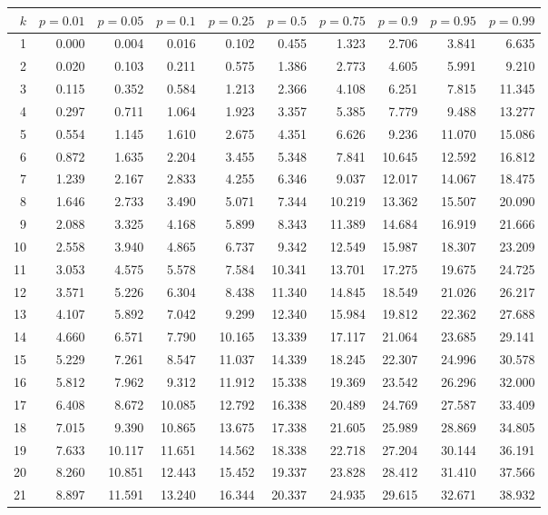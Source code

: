 %
%
%

\begin{table}[ht]
\begin{center}
\footnotesize
\begin{tabular}{|r|rrr|rrr|rrr|}
\hline
\strut$k$&$p=0.01$&$p=0.05$&$p=0.1$&$p=0.25$&$p=0.5$&$p=0.75$&$p=0.9$&$p=0.95$&$p=0.99$\\
\hline
1&0.000&0.004&0.016&0.102&0.455&1.323&2.706&3.841&6.635\\
2&0.020&0.103&0.211&0.575&1.386&2.773&4.605&5.991&9.210\\
3&0.115&0.352&0.584&1.213&2.366&4.108&6.251&7.815&11.345\\
4&0.297&0.711&1.064&1.923&3.357&5.385&7.779&9.488&13.277\\
5&0.554&1.145&1.610&2.675&4.351&6.626&9.236&11.070&15.086\\
6&0.872&1.635&2.204&3.455&5.348&7.841&10.645&12.592&16.812\\
7&1.239&2.167&2.833&4.255&6.346&9.037&12.017&14.067&18.475\\
8&1.646&2.733&3.490&5.071&7.344&10.219&13.362&15.507&20.090\\
9&2.088&3.325&4.168&5.899&8.343&11.389&14.684&16.919&21.666\\
10&2.558&3.940&4.865&6.737&9.342&12.549&15.987&18.307&23.209\\
11&3.053&4.575&5.578&7.584&10.341&13.701&17.275&19.675&24.725\\
12&3.571&5.226&6.304&8.438&11.340&14.845&18.549&21.026&26.217\\
13&4.107&5.892&7.042&9.299&12.340&15.984&19.812&22.362&27.688\\
14&4.660&6.571&7.790&10.165&13.339&17.117&21.064&23.685&29.141\\
15&5.229&7.261&8.547&11.037&14.339&18.245&22.307&24.996&30.578\\
16&5.812&7.962&9.312&11.912&15.338&19.369&23.542&26.296&32.000\\
17&6.408&8.672&10.085&12.792&16.338&20.489&24.769&27.587&33.409\\
18&7.015&9.390&10.865&13.675&17.338&21.605&25.989&28.869&34.805\\
19&7.633&10.117&11.651&14.562&18.338&22.718&27.204&30.144&36.191\\
20&8.260&10.851&12.443&15.452&19.337&23.828&28.412&31.410&37.566\\
21&8.897&11.591&13.240&16.344&20.337&24.935&29.615&32.671&38.932\\

\end{tabular}
\end{center}
\end{table}
